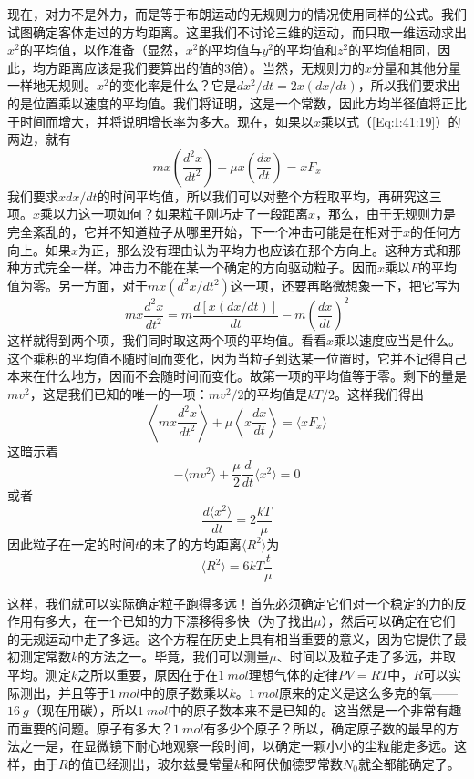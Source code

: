 现在，对力不是外力，而是等于布朗运动的无规则力的情况使用同样的公式。我们试图确定客体走过的方均距离。这里我们不讨论三维的运动，而只取一维运动求出$x^2$的平均值，以作准备（显然，$x^2$的平均值与$y^2$的平均值和$z^2$的平均值相同，因此，均方距离应该是我们要算出的值的3倍）。当然，无规则力的$x$分量和其他分量一样地无规则。$x^2$的变化率是什么？它是$dx^2/dt=2x(dx/dt)$，所以我们要求出的是位置乘以速度的平均值。我们将证明，这是一个常数，因此方均半径值将正比于时间而增大，并将说明增长率为多大。现在，如果以$x$乘以式（\ref{Eq:I:41:19}）的两边，就有
\begin{equation*}
    mx\left ( \frac{d^2x}{dt^2} \right ) + \mu x \left ( \frac{dx}{dt} \right ) = xF_x
\end{equation*}
我们要求$xdx/dt$的时间平均值，所以我们可以对整个方程取平均，再研究这三项。$x$乘以力这一项如何？如果粒子刚巧走了一段距离$x$，那么，由于无规则力是完全紊乱的，它并不知道粒子从哪里开始，下一个冲击可能是在相对于$x$的任何方向上。如果$x$为正，那么没有理由认为平均力也应该在那个方向上。这种方式和那种方式完全一样。冲击力不能在某一个确定的方向驱动粒子。因而$x$乘以$F$的平均值为零。另一方面，对于$mx(d^2x/dt^2)$这一项，还要再略微想象一下，把它写为
\begin{equation*}
    mx\frac{d^2x}{dt^2} = m\frac{d[x(dx/dt)]}{dt} - m \left ( \frac{dx}{dt} \right )^2
\end{equation*}
这样就得到两个项，我们同时取这两个项的平均值。看看$x$乘以速度应当是什么。这个乘积的平均值不随时间而变化，因为当粒子到达某一位置时，它并不记得自己本来在什么地方，因而不会随时间而变化。故第一项的平均值等于零。剩下的量是$mv^2$，这是我们已知的唯一的一项：$mv^2/2$的平均值是$kT/2$。这样我们得出
\begin{equation*}
    \left \langle mx\frac{d^2x}{dt^2} \right \rangle + \mu \left \langle x\frac{dx}{dt} \right \rangle = \langle xF_x \rangle
\end{equation*}
这暗示着
\begin{equation*}
    -\langle mv^2 \rangle + \frac{\mu}{2}\frac{d}{dt}\langle x^2 \rangle = 0
\end{equation*}
或者
\begin{equation}
    \label{Eq:I:41:20}
    \frac{d\langle x^2 \rangle}{dt} = 2\frac{kT}{\mu}
\end{equation}
因此粒子在一定的时间$t$的末了的方均距离$\langle R^2 \rangle$为
\begin{equation}
    \label{Eq:I:41:21}
    \langle R^2 \rangle = 6kT\frac{t}{\mu}
\end{equation}

这样，我们就可以实际确定粒子跑得多远！首先必须确定它们对一个稳定的力的反作用有多大，在一个已知的力下漂移得多快（为了找出$\mu$），然后可以确定在它们的无规运动中走了多远。这个方程在历史上具有相当重要的意义，因为它提供了最初测定常数$k$的方法之一。毕竟，我们可以测量$\mu$、时间以及粒子走了多远，并取平均。测定$k$之所以重要，原因在于在$1~mol$理想气体的定律$PV=RT$中，$R$可以实际测出，并且等于$1~mol$中的原子数乘以$k$。$1~mol$原来的定义是这么多克的氧——$16~g$（现在用碳），所以$1~mol$中的原子数本来不是已知的。这当然是一个非常有趣而重要的问题。原子有多大？$1~mol$有多少个原子？所以，确定原子数的最早的方法之一是，在显微镜下耐心地观察一段时间，以确定一颗小小的尘粒能走多远。这样，由于$R$的值已经测出，玻尔兹曼常量$k$和阿伏伽德罗常数$N_0$就全都能确定了。